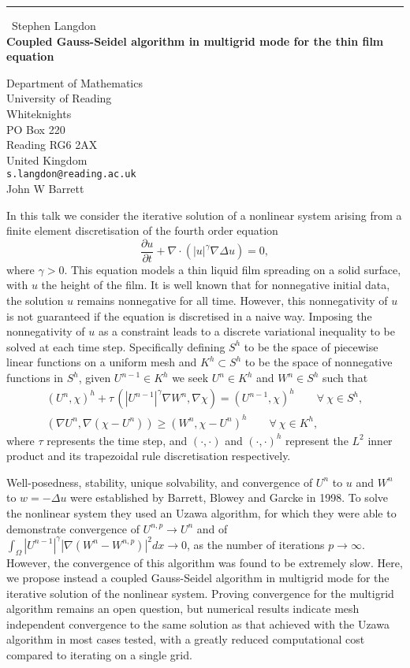 \documentclass{report}
\begin{document}
\begin{center}
\rule{6in}{1pt} \
{\large Stephen Langdon \\
{\bf Coupled Gauss-Seidel algorithm in multigrid mode for the thin film equation}}

Department of Mathematics \\ University of Reading \\ Whiteknights \\ PO Box 220 \\ Reading RG6 2AX \\ United Kingdom
\\
{\tt s.langdon@reading.ac.uk}\\
John W Barrett\end{center}

In this talk we consider the iterative solution of a nonlinear
system arising from a finite element discretisation of the fourth
order equation
\[ \frac{\partial u}{\partial t} + \nabla \cdot (|u|^{\gamma}\nabla\Delta u) =
0, \] where $\gamma>0$. This equation models a thin liquid film
spreading on a solid surface, with $u$ the height of the film. It is
well known that for nonnegative initial data, the solution $u$
remains nonnegative for all time. However, this nonnegativity of
$u$ is not guaranteed if the equation is discretised in a naive way.
Imposing the nonnegativity of $u$ as a constraint leads to a
discrete variational inequality to be solved at each time step.
Specifically defining $S^h$ to be the space of piecewise linear
functions on a uniform mesh and $K^h\subset S^h$ to be the space of
nonnegative functions in $S^h$, given $U^{n-1}\in K^h$ we seek
$U^{n} \in K^h$ and $W^n \in S^h$ such that
\begin{eqnarray*}
&(U^{n},\chi)^h + \tau\,(|U^{n-1}|^{\gamma}\nabla W^n,\nabla \chi) = (U^{n-1},\chi)^h
\qquad \forall \ \chi \in S^h,& \\
&(\nabla U^{n},\nabla (\chi-U^{n})) \geq (W^{n},
\chi-U^n)^h \qquad \forall \ \chi \in K^h,&
\end{eqnarray*}
where $\tau$ represents the time step, and $(\cdot,\cdot)$ and
$(\cdot,\cdot)^h$ represent the $L^2$ inner product and its
trapezoidal rule discretisation respectively.

Well-posedness, stability, unique solvability, and convergence of
$U^n$ to $u$ and $W^n$ to $w=-\Delta u$ were established by Barrett,
Blowey and Garcke in 1998. To solve the nonlinear system they used
an Uzawa algorithm, for which they were able to demonstrate
convergence of $U^{n,p}\rightarrow U^n$ and of $\int_{\Omega}
|U^{n-1}|^{\gamma} |\nabla(W^n-W^{n,p})|^2 dx \rightarrow 0$, as the
number of iterations $p\rightarrow\infty$. However, the convergence
of this algorithm was found to be extremely slow. Here, we propose
instead a coupled Gauss-Seidel algorithm in multigrid mode for the
iterative solution of the nonlinear system. Proving convergence for
the multigrid algorithm remains an open question, but numerical
results indicate mesh independent convergence to the same solution
as that achieved with the Uzawa algorithm in most cases tested, with
a greatly reduced computational cost compared to iterating on a
single grid.
\end{document}
